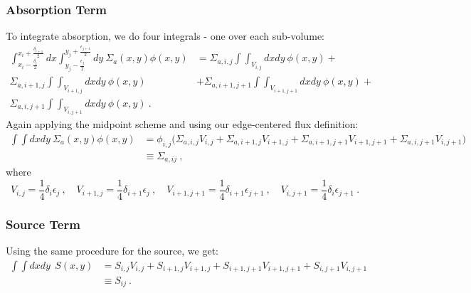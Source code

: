 \documentclass[12pt, answers]{exam}
\begin{document}
\subsubsection*{Absorption Term}
To integrate absorption, we do four integrals - one over each sub-volume:
%
\begin{align}
\int_{x_i-\frac{\delta_{i}}{2}}^{x_i+\frac{\delta_{i+1}}{2}} dx \int_{y_j-\frac{\epsilon_{j}}{2}}^{y_j+\frac{\epsilon_{j+1}}{2}}dy\:\Sigma_a(x,y) \phi(x,y) &= \Sigma_{a,i,j}\int\int_{V_{i,j}} dx dy \: \phi(x,y) + \nonumber \\
%
\Sigma_{a,i+1,j}\int\int_{V_{i+1,j}} dx dy \: \phi(x,y) &+ \Sigma_{a,i+1,j+1}\int\int_{V_{i+1,j+1}} dx dy \: \phi(x,y) + \nonumber \\
 \Sigma_{a,i,j+1}\int\int_{V_{i,j+1}} dx dy \: \phi(x,y) \:.\nonumber
\end{align}
%
Again applying the midpoint scheme and using our edge-centered flux definition:
%
\begin{align}
\int \int dx dy\:\Sigma_a(x,y) \phi(x,y) &= \boxed{\phi_{i,j}\bigl(\Sigma_{a,i,j} V_{i,j} + \Sigma_{a,i+1,j} V_{i+1,j} + \Sigma_{a,i+1,j+1} V_{i+1,j+1} + \Sigma_{a,i,j+1} V_{i,j+1} \bigr) } \nonumber \\
&\equiv \Sigma_{a,ij}\:, \nonumber
\end{align}
%
where
\[V_{i,j} = \frac{1}{4}\delta_i \epsilon_j \:, \quad V_{i+1,j} = \frac{1}{4}\delta_{i+1} \epsilon_{j} \:, \quad V_{i+1,j+1} = \frac{1}{4}\delta_{i+1} \epsilon_{j+1} \:, \quad V_{i,j+1} = \frac{1}{4}\delta_{i} \epsilon_{j+1} \:.\]


\subsubsection*{Source Term}
Using the same procedure for the source, we get:
\begin{align}
\int \int dx dy \: \:S(x,y) &= \boxed{ S_{i,j} V_{i,j} + S_{i+1,j} V_{i+1,j} + S_{i+1,j+1} V_{i+1,j+1} + S_{i,j+1} V_{i,j+1} }\nonumber \\
&\equiv S_{ij}\:. \nonumber
\end{align}


\end{document}
